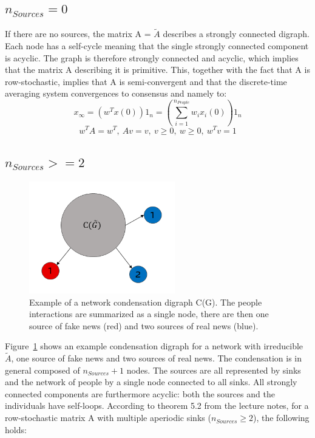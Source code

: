 \subsection{$n_{Sources} = 0$}
If there are no sources, the matrix A = $\tilde{A}$ describes a strongly connected digraph. Each node has a self-cycle meaning that the single strongly connected component is acyclic. The graph is therefore strongly connected and acyclic, which implies that the matrix A describing it is primitive. This, together with the fact that A is row-stochastic, implies that A is semi-convergent and that the discrete-time averaging system convergences to consensus and namely to:
$$
x_{\infty} = (w^Tx(0))1_n = (\sum_{i=1}^{n_{People}}w_ix_i(0))1_n
$$
$$
w^TA = w^T,\ 
Av = v,\ 
v \geq 0,\ w \geq 0,\ w^Tv = 1
$$
\subsection{$n_{Sources} >= 2$}
\begin{figure}[!t]
	\centering
	\includegraphics[width=2.5in]{Figures/condensation_digraph.png}
	\caption{Example of a network condensation digraph C(G). The people interactions are summarized as a single node, there are then one source of fake news (red) and two sources of real news (blue).}
	\label{pics:condensation_digraph_example}
\end{figure}
Figure~\ref{pics:condensation_digraph_example} shows an example condensation digraph for a network with irreducible $\tilde{A}$, one source of fake news and two sources of real news. The condensation is in general composed of $n_{Sources}+1$ nodes. The sources are all represented by sinks and the network of people by a single node connected to all sinks. \newline
All strongly connected components are furthermore acyclic: both the sources and the individuals have self-loops.
According to theorem 5.2 from the lecture notes, for a row-stochastic matrix A with multiple aperiodic sinks ($n_{Sources} \geq 2$), the following holds:
